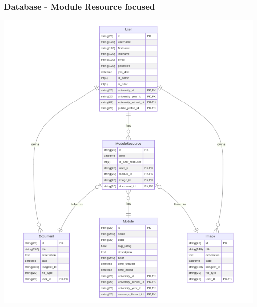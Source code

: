\subsubsection{Database - Module Resource focused}

\includegraphics[scale=0.63]{images/database/db_module_resource.png}

